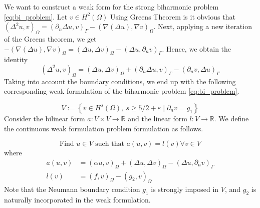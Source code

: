 \documentclass[11pt]{article}
\theoremstyle{remark}
\renewcommand{\ge}{\geqslant}
\numberwithin{equation}{section}
\begin{document}
We want to construct a weak form for the strong biharmonic problem \eqref{eq:bi_problem}. Let $v \in H^{2}( \Omega ) $  Using Greens Theorem is it obvious that \(
\left( \Delta ^2 u,v \right) _{ \Omega  }   = ( \partial _{n} \Delta u, v ) _{\Gamma   } - ( \nabla \left( \Delta  u \right) , \nabla v ) _{ \Omega }
\).
Next, applying a new iteration of the Greens theorem, we get
$ -( \nabla ( \Delta u ) , \nabla v ) _{\Omega  }  =   ( \Delta u, \Delta v ) _{\Omega } - ( \Delta u, \partial _{n}v )_{\Gamma } $.
Hence, we obtain the identity
\begin{equation}
\label{eq:iden_bi}
( \Delta ^2 u, v ) _{\Omega } = ( \Delta u, \Delta v)_{\Omega } +  ( \partial _{n} \Delta u, v)_{\Gamma } - ( \partial _{n} v, \Delta u) _{\Gamma }
\end{equation}
Taking into account the boundary conditions, we end up with the following corresponding weak formulation of the biharmonic problem \eqref{eq:bi_problem}.

\begin{equation}
\label{eq:V_deg}
V := \left\{ v \in  H^s( \Omega ), \  s \ge  5  /2 + \varepsilon   \mid \partial _{n} v  = g_{1}     \right\}
\end{equation}
Consider the bilinear form $a:V\times V \to \mathbb{R}$ and the linear form $l: V \to \mathbb{R}$. We define the continuous weak formulation problem formulation as follows.


\begin{equation}
\label{eq:cont_weak_problem}
\text{Find } u \in V   \text{ such that } a( u,v) = l( v)  \forall v \in V
\end{equation}
where
\begin{equation}
    \begin{split}
a( u,v) & =  ( \alpha u,v)_{\Omega } + ( \Delta u, \Delta v)_{\Omega } - (  \Delta u, \partial _{n} v) _{\Gamma }\\
l( v)  &= ( f,v)_{\Omega } - ( g_{2} , v)_\Omega
    \end{split}
\end{equation}
Note that the Neumann boundary condition $g_{1}$ is strongly imposed in $V$, and $g_{2}$ is naturally incorporated in the weak formulation.
\end{document}

